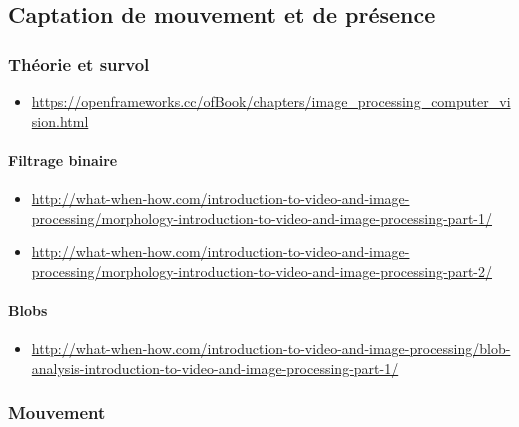\documentclass[
  french,
]{book}
\providecommand{\tightlist}{%
  \setlength{\itemsep}{0pt}\setlength{\parskip}{0pt}}
\begin{document}
\hypertarget{captation-de-mouvement-et-de-pruxe9sence}{%
\subsection{Captation de mouvement et de présence}\label{captation-de-mouvement-et-de-pruxe9sence}}

\hypertarget{thuxe9orie-et-survol}{%
\subsubsection{Théorie et survol}\label{thuxe9orie-et-survol}}

\begin{itemize}
\tightlist
\item
  \url{https://openframeworks.cc/ofBook/chapters/image_processing_computer_vision.html}
\end{itemize}

\hypertarget{filtrage-binaire}{%
\paragraph{Filtrage binaire}\label{filtrage-binaire}}

\begin{itemize}
\tightlist
\item
  \url{http://what-when-how.com/introduction-to-video-and-image-processing/morphology-introduction-to-video-and-image-processing-part-1/}
\item
  \url{http://what-when-how.com/introduction-to-video-and-image-processing/morphology-introduction-to-video-and-image-processing-part-2/}
\end{itemize}

\hypertarget{blobs}{%
\paragraph{Blobs}\label{blobs}}

\begin{itemize}
\tightlist
\item
  \url{http://what-when-how.com/introduction-to-video-and-image-processing/blob-analysis-introduction-to-video-and-image-processing-part-1/}
\end{itemize}

\hypertarget{interagir_mouvement}{%
\subsubsection{Mouvement}\label{interagir_mouvement}}
\end{document}
